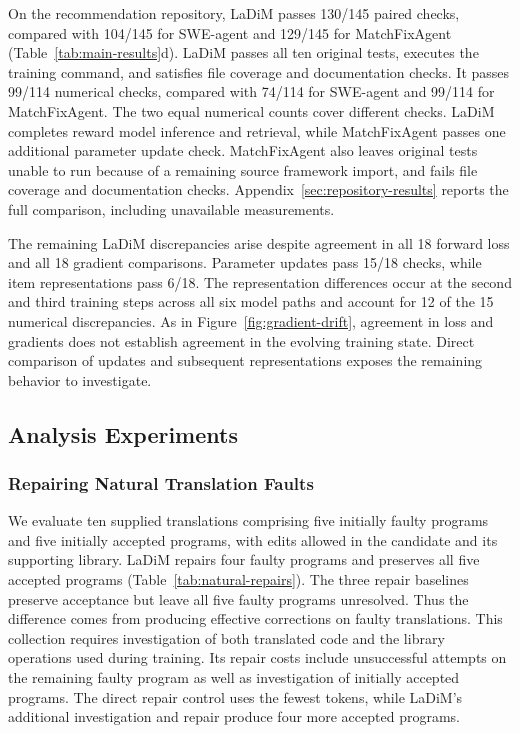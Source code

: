\documentclass{article}
\begin{document}
On the recommendation repository, LaDiM passes 130/145 paired checks, compared with 104/145 for SWE-agent and 129/145 for MatchFixAgent (Table~\ref{tab:main-results}d). LaDiM passes all ten original tests, executes the training command, and satisfies file coverage and documentation checks. It passes 99/114 numerical checks, compared with 74/114 for SWE-agent and 99/114 for MatchFixAgent. The two equal numerical counts cover different checks. LaDiM completes reward model inference and retrieval, while MatchFixAgent passes one additional parameter update check. MatchFixAgent also leaves original tests unable to run because of a remaining source framework import, and fails file coverage and documentation checks. Appendix~\ref{sec:repository-results} reports the full comparison, including unavailable measurements.

The remaining LaDiM discrepancies arise despite agreement in all 18 forward loss and all 18 gradient comparisons. Parameter updates pass 15/18 checks, while item representations pass 6/18. The representation differences occur at the second and third training steps across all six model paths and account for 12 of the 15 numerical discrepancies. As in Figure~\ref{fig:gradient-drift}, agreement in loss and gradients does not establish agreement in the evolving training state. Direct comparison of updates and subsequent representations exposes the remaining behavior to investigate.

\subsection{Analysis Experiments}
\label{sec:fault-characterization}

\subsubsection{Repairing Natural Translation Faults}

We evaluate ten supplied translations comprising five initially faulty programs and five initially accepted programs, with edits allowed in the candidate and its supporting library. LaDiM repairs four faulty programs and preserves all five accepted programs (Table~\ref{tab:natural-repairs}). The three repair baselines preserve acceptance but leave all five faulty programs unresolved. Thus the difference comes from producing effective corrections on faulty translations. This collection requires investigation of both translated code and the library operations used during training. Its repair costs include unsuccessful attempts on the remaining faulty program as well as investigation of initially accepted programs. The direct repair control uses the fewest tokens, while LaDiM's additional investigation and repair produce four more accepted programs.
\end{document}
